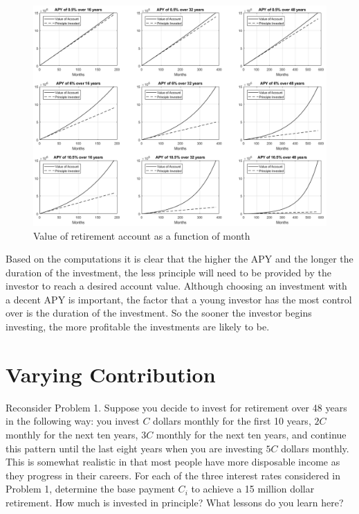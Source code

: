 \documentclass[letterpaper]{report}
\begin{document}
\subsubsection{}
\begin{figure}[h]
	\centering
	\includegraphics[width=0.95\linewidth]{../hw21_1_cropped}
	\caption{Value of retirement account as a function of month}
\end{figure}

Based on the computations it is clear that the higher the APY and the longer the duration of the investment, the less principle will need to be provided by the investor to reach a desired account value. Although choosing an investment with a decent APY is important, the factor that a young investor has the most control over is the duration of the investment. So the sooner the investor begins investing, the more profitable the investments are likely to be.

\pagebreak
\section{Varying Contribution}
Reconsider Problem 1. Suppose you decide to invest for retirement over 48 years in the following way: you invest $C$ dollars monthly for the first 10 years, $2C$ monthly for the next ten years, $3C$ monthly for the next ten years, and continue this pattern until the last eight years when you are investing $5C$ dollars monthly. This is somewhat realistic in that most people have more disposable income as they progress in their careers. For each of the three interest rates considered in Problem 1, determine the base payment $C_{i}$ to achieve a 15 million dollar retirement. How much is invested in principle? What lessons do you learn here?
\end{document}
